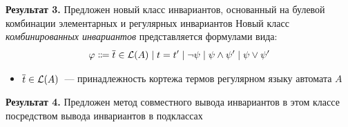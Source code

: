 \begin{frame}{\textbf{Результат 3.} Предложен новый класс инвариантов, основанный на булевой комбинации элементарных и регулярных инвариантов}
Новый класс \emph{комбинированных инвариантов} представляется формулами вида:
$$\varphi \Coloneqq \overline{t}\in \mathcal{L}(A) \mid t = t' \mid \neg\psi \mid \psi \land \psi' \mid \psi \lor \psi'$$
\vspace*{-8mm}
\begin{itemize}
    \item $\overline{t}\in \mathcal{L}(A)$~--- принадлежность кортежа термов регулярном языку автомата $A$
\end{itemize}
\end{frame}

\begin{frame}{\textbf{Результат 4.} Предложен метод совместного вывода инвариантов в этом классе посредством вывода инвариантов в подклассах}
\whenFullCompile{\centering\ciciPic}
\end{frame}

